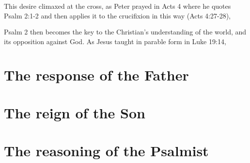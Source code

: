 This desire climaxed at the cross, 
    as Peter prayed in Acts 4 where he quotes Psalm 2:1-2
    and then applies it to the crucifixion in this way (Acts 4:27-28),

Psalm 2 then becomes the key to the Christian's understanding of the world,
    and its opposition against God.
As Jesus taught in parable form in Luke 19:14,


\section{The response of the Father}
\section{The reign of the Son}
\section{The reasoning of the Psalmist}
